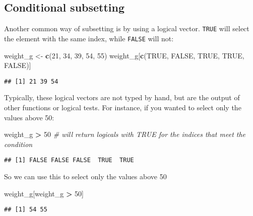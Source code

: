 \documentclass[]{book}
\newenvironment{Shaded}{\begin{snugshade}}{\end{snugshade}}
\newcommand{\KeywordTok}[1]{\textcolor[rgb]{0.13,0.29,0.53}{\textbf{#1}}}
\newcommand{\DecValTok}[1]{\textcolor[rgb]{0.00,0.00,0.81}{#1}}
\newcommand{\StringTok}[1]{\textcolor[rgb]{0.31,0.60,0.02}{#1}}
\newcommand{\CommentTok}[1]{\textcolor[rgb]{0.56,0.35,0.01}{\textit{#1}}}
\newcommand{\OtherTok}[1]{\textcolor[rgb]{0.56,0.35,0.01}{#1}}
\newcommand{\OperatorTok}[1]{\textcolor[rgb]{0.81,0.36,0.00}{\textbf{#1}}}
\newcommand{\NormalTok}[1]{#1}
\begin{document}
\subsection{Conditional subsetting}\label{conditional-subsetting}

Another common way of subsetting is by using a logical vector.
\texttt{TRUE} will select the element with the same index, while
\texttt{FALSE} will not:

\begin{Shaded}
\begin{Highlighting}[]
\NormalTok{weight_g <-}\StringTok{ }\KeywordTok{c}\NormalTok{(}\DecValTok{21}\NormalTok{, }\DecValTok{34}\NormalTok{, }\DecValTok{39}\NormalTok{, }\DecValTok{54}\NormalTok{, }\DecValTok{55}\NormalTok{)}
\NormalTok{weight_g[}\KeywordTok{c}\NormalTok{(}\OtherTok{TRUE}\NormalTok{, }\OtherTok{FALSE}\NormalTok{, }\OtherTok{TRUE}\NormalTok{, }\OtherTok{TRUE}\NormalTok{, }\OtherTok{FALSE}\NormalTok{)]}
\end{Highlighting}
\end{Shaded}

\begin{verbatim}
## [1] 21 39 54
\end{verbatim}

Typically, these logical vectors are not typed by hand, but are the
output of other functions or logical tests. For instance, if you wanted
to select only the values above 50:

\begin{Shaded}
\begin{Highlighting}[]
\NormalTok{weight_g }\OperatorTok{>}\StringTok{ }\DecValTok{50}   \CommentTok{# will return logicals with TRUE for the indices that meet the condition}
\end{Highlighting}
\end{Shaded}

\begin{verbatim}
## [1] FALSE FALSE FALSE  TRUE  TRUE
\end{verbatim}

So we can use this to select only the values above 50

\begin{Shaded}
\begin{Highlighting}[]
\NormalTok{weight_g[weight_g }\OperatorTok{>}\StringTok{ }\DecValTok{50}\NormalTok{]}
\end{Highlighting}
\end{Shaded}

\begin{verbatim}
## [1] 54 55
\end{verbatim}
\end{document}
